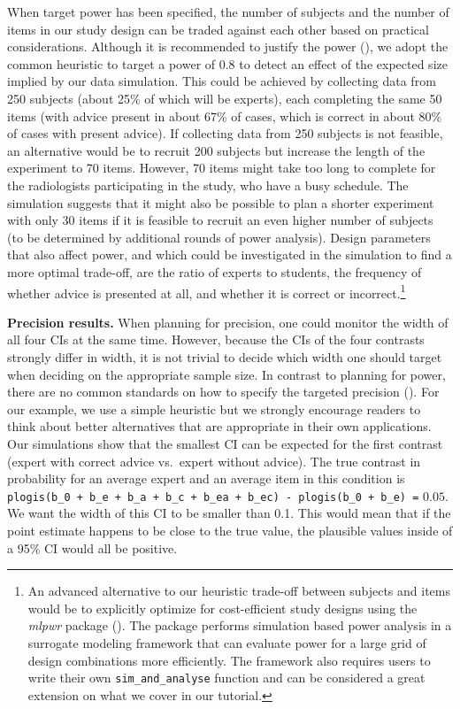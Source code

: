 \documentclass[
  man,
  floatsintext,
  longtable,
  a4paper,
  nolmodern,
  notxfonts,
  notimes,
  colorlinks=true,linkcolor=blue,citecolor=blue,urlcolor=blue]{apa7}
\begin{document}
When target power has been specified, the number of subjects and the
number of items in our study design can be traded against each other
based on practical considerations. Although it is recommended to justify
the power (), we adopt the common heuristic to target a power of 0.8 to
detect an effect of the expected size implied by our data simulation.
This could be achieved by collecting data from 250 subjects (about 25\%
of which will be experts), each completing the same 50 items (with
advice present in about 67\% of cases, which is correct in about 80\% of
cases with present advice). If collecting data from 250 subjects is not
feasible, an alternative would be to recruit 200 subjects but increase
the length of the experiment to 70 items. However, 70 items might take
too long to complete for the radiologists participating in the study,
who have a busy schedule. The simulation suggests that it might also be
possible to plan a shorter experiment with only 30 items if it is
feasible to recruit an even higher number of subjects (to be determined
by additional rounds of power analysis). Design parameters that also
affect power, and which could be investigated in the simulation to find
a more optimal trade-off, are the ratio of experts to students, the
frequency of whether advice is presented at all, and whether it is
correct or incorrect.\footnote{An advanced alternative to our heuristic
  trade-off between subjects and items would be to explicitly optimize
  for cost-efficient study designs using the \emph{mlpwr} package
  ().
  The package performs simulation based power analysis in a surrogate
  modeling framework that can evaluate power for a large grid of design
  combinations more efficiently. The framework also requires users to
  write their own \texttt{sim\_and\_analyse} function and can be
  considered a great extension on what we cover in our tutorial.}

\textbf{Precision results.} When planning for precision, one could
monitor the width of all four CIs at the same time. However, because the
CIs of the four contrasts strongly differ in width, it is not trivial to
decide which width one should target when deciding on the appropriate
sample size. In contrast to planning for power, there are no common
standards on how to specify the targeted precision
(). For
our example, we use a simple heuristic but we strongly encourage readers
to think about better alternatives that are appropriate in their own
applications. Our simulations show that the smallest CI can be expected
for the first contrast (expert with correct advice vs.~expert without
advice). The true contrast in probability for an average expert and an
average item in this condition is
\texttt{plogis(b\_0\ +\ b\_e\ +\ b\_a\ +\ b\_c\ +\ b\_ea\ +\ b\_ec)\ -\ plogis(b\_0\ +\ b\_e)\ =}
\(0.05\). We want the width of this CI to be smaller than 0.1. This
would mean that if the point estimate happens to be close to the true
value, the plausible values inside of a 95\% CI would all be positive.
\end{document}
